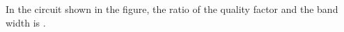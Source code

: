 \item In the circuit shown in the figure, the ratio of the quality factor and the band width is \underline{\hspace{2.5cm}}.

\begin{center}
\end{center}